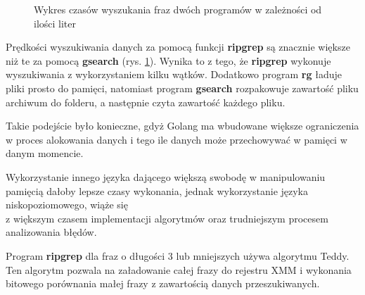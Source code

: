 \begin{figure}[htbp]
    \centering
    \caption{Wykres czasów wyszukania fraz dwóch programów w zależności od ilości liter}
    \label{fig:wykresPorównaniaCzasówWyszukań}
\end{figure}

Prędkości wyszukiwania danych za pomocą funkcji \textbf{ripgrep} są znacznie większe niż te
za pomocą \textbf{gsearch} (rys. \ref{fig:wykresPorównaniaCzasówWyszukań}). Wynika to z
tego, że \textbf{ripgrep} wykonuje wyszukiwania z wykorzystaniem kilku wątków. Dodatkowo 
program \textbf{rg} ładuje pliki prosto do pamięci, natomiast program \textbf{gsearch} rozpakowuje
zawartość pliku archiwum do folderu, a następnie czyta zawartość każdego pliku.

Takie podejście było konieczne, gdyż Golang ma wbudowane większe ograniczenia w 
proces alokowania danych i tego ile danych może przechowywać w pamięci w danym momencie.

Wykorzystanie innego języka dającego większą swobodę w manipulowaniu pamięcią 
dałoby lepsze czasy wykonania, jednak wykorzystanie języka niskopoziomowego,
wiąże się \\ z większym czasem implementacji algorytmów oraz trudniejszym procesem
analizowania błędów.

Program \textbf{ripgrep} dla fraz o długości 3 lub mniejszych używa algorytmu Teddy. Ten algorytm
pozwala na załadowanie całej frazy do rejestru XMM i wykonania bitowego 
porównania małej frazy z zawartością danych przeszukiwanych.


